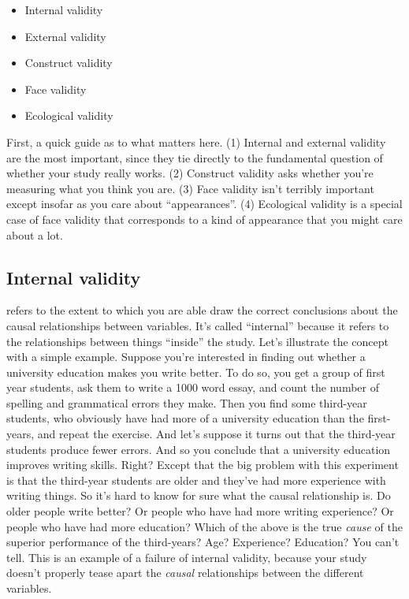 \begin{itemize} \itemsep -2pt
\item Internal validity
\item External validity
\item Construct validity
\item Face validity
\item Ecological validity
\end{itemize}

First, a quick guide as to what matters here. (1) Internal and external validity are the most important, since they tie directly to the fundamental question of whether your study really works. (2) Construct validity asks whether you're measuring what you think you are. (3) Face validity isn't terribly important except insofar as you care about ``appearances''. (4) Ecological validity is a special case of face validity that corresponds to a kind of appearance that you might care about a lot.

\subsection{Internal validity}

 refers to the extent to which you are able draw the correct conclusions about the causal relationships between variables. It's called ``internal'' because it refers to the relationships between things ``inside'' the study.  Let's illustrate the concept with a simple example. Suppose you're interested in finding out whether a university education makes you write better. To do so, you get a group of first year students, ask them to write a 1000 word essay, and count the number of spelling and grammatical errors they make. Then you find some third-year students, who obviously have had more of a university education than the first-years, and repeat the exercise. And let's suppose it turns out that the third-year students produce fewer errors. And so you conclude that a university education improves writing skills. Right? Except that the big problem with this experiment is that the third-year students are older and they've had more experience with writing things. So it's hard to know for sure what the causal relationship is. Do older people write better? Or people who have had more writing experience? Or people who have had more education? Which of the above is the true {\it cause} of the superior performance of the third-years? Age? Experience? Education?  You can't tell.  This is an example of a failure of internal validity, because your study doesn't properly tease apart the {\it causal} relationships between the different variables. 


